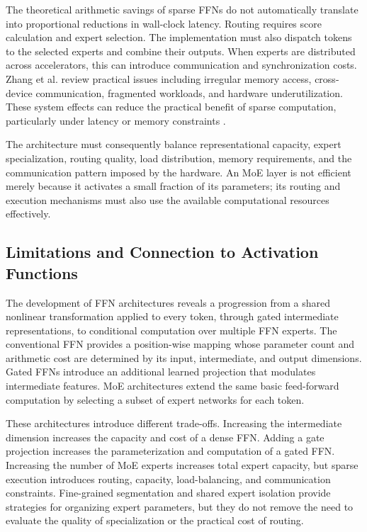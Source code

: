 The theoretical arithmetic savings of sparse FFNs do not automatically
translate into proportional reductions in wall-clock latency. Routing
requires score calculation and expert selection. The implementation
must also dispatch tokens to the selected experts and combine their
outputs. When experts are distributed across accelerators, this can
introduce communication and synchronization costs. Zhang et al.
review practical issues including irregular memory access,
cross-device communication, fragmented workloads, and hardware
underutilization. These system effects can reduce the practical
benefit of sparse computation, particularly under latency or memory
constraints \parencite{zhang2025moe}.

The architecture must consequently balance representational capacity,
expert specialization, routing quality, load distribution, memory
requirements, and the communication pattern imposed by the hardware.
An MoE layer is not efficient merely because it activates a small
fraction of its parameters; its routing and execution mechanisms must
also use the available computational resources effectively.

\subsection{Limitations and Connection to Activation Functions}
\label{subsec:ffn-limitations-transition}

The development of FFN architectures reveals a progression from a
shared nonlinear transformation applied to every token, through
gated intermediate representations, to conditional computation
over multiple FFN experts. The conventional FFN provides a
position-wise mapping whose parameter count and arithmetic cost are
determined by its input, intermediate, and output dimensions. Gated
FFNs introduce an additional learned projection that modulates
intermediate features. MoE architectures extend the same basic
feed-forward computation by selecting a subset of expert networks
for each token.

These architectures introduce different trade-offs. Increasing the
intermediate dimension increases the capacity and cost of a dense
FFN. Adding a gate projection increases the parameterization and
computation of a gated FFN. Increasing the number of MoE experts
increases total expert capacity, but sparse execution introduces
routing, capacity, load-balancing, and communication constraints.
Fine-grained segmentation and shared expert isolation provide
strategies for organizing expert parameters, but they do not remove
the need to evaluate the quality of specialization or the practical
cost of routing.

